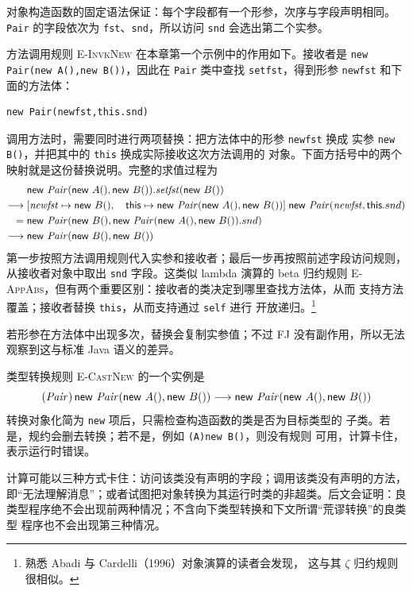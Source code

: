 对象构造函数的固定语法保证：每个字段都有一个形参，次序与字段声明相同。
\texttt{Pair} 的字段依次为 \texttt{fst}、\texttt{snd}，所以访问
\texttt{snd} 会选出第二个实参。

方法调用规则 \textsc{E-InvkNew} 在本章第一个示例中的作用如下。接收者是
\texttt{new Pair(new A(),new B())}，因此在 \texttt{Pair} 类中查找
\texttt{setfst}，得到形参 \texttt{newfst} 和下面的方法体：
\begin{lstlisting}
new Pair(newfst,this.snd)
\end{lstlisting}
调用方法时，需要同时进行两项替换：把方法体中的形参 \texttt{newfst} 换成
实参 \texttt{new B()}，并把其中的 \texttt{this} 换成实际接收这次方法调用的
对象。下面方括号中的两个映射就是这份替换说明。完整的求值过程为
\[
\begin{aligned}
&\mathsf{new}\ \mathit{Pair}(\mathsf{new}\ A(),\mathsf{new}\ B())
  .\mathit{setfst}(\mathsf{new}\ B())\\
\trans{}&
  [\mathit{newfst}\mapsto\mathsf{new}\ B(),\nobreak\quad
   \mathsf{this}\mapsto
     \mathsf{new}\ \mathit{Pair}(\mathsf{new}\ A(),\mathsf{new}\ B())]
  \;\mathsf{new}\ \mathit{Pair}(\mathit{newfst},\mathsf{this}.snd)\\
={}&\mathsf{new}\ \mathit{Pair}
  (\mathsf{new}\ B(),
   \mathsf{new}\ \mathit{Pair}(\mathsf{new}\ A(),\mathsf{new}\ B()).snd)\\
\trans{}&\mathsf{new}\ \mathit{Pair}(\mathsf{new}\ B(),\mathsf{new}\ B())
\end{aligned}
\]
第一步按照方法调用规则代入实参和接收者；最后一步再按照前述字段访问规则，
从接收者对象中取出 \texttt{snd} 字段。这类似 lambda 演算的 beta 归约规则
\textsc{E-AppAbs}，但有两个重要区别：接收者的类决定到哪里查找方法体，从而
支持方法覆盖；接收者替换 \texttt{this}，从而支持通过 \texttt{self} 进行
开放递归。\footnote{熟悉 Abadi 与 Cardelli（1996）对象演算的读者会发现，
这与其 \(\zeta\) 归约规则很相似。}

若形参在方法体中出现多次，替换会复制实参值；不过 FJ 没有副作用，所以无法
观察到这与标准 Java 语义的差异。

类型转换规则 \textsc{E-CastNew} 的一个实例是
\[
(\mathit{Pair})\,\mathsf{new}\ \mathit{Pair}
  (\mathsf{new}\ A(),\mathsf{new}\ B())
\trans
\mathsf{new}\ \mathit{Pair}(\mathsf{new}\ A(),\mathsf{new}\ B())
\]
转换对象化简为 \texttt{new} 项后，只需检查构造函数的类是否为目标类型的
子类。若是，规约会删去转换；若不是，例如 \texttt{(A)new B()}，则没有规则
可用，计算卡住，表示运行时错误。

计算可能以三种方式卡住：访问该类没有声明的字段；调用该类没有声明的方法，
即“无法理解消息”；或者试图把对象转换为其运行时类的非超类。后文会证明：良
类型程序绝不会出现前两种情况；不含向下类型转换和下文所谓“荒谬转换”的良类型
程序也不会出现第三种情况。

